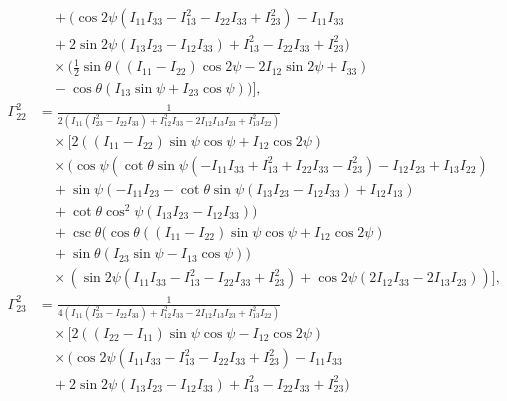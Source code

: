 \documentclass[pdflatex,sn-mathphys-num]{sn-jnl}%
\theoremstyle{thmstyleone}%
\theoremstyle{thmstyletwo}%
\theoremstyle{thmstylethree}%
\begin{document}
\begin{appendices}
\begin{align}
    &\quad +\Big(\cos 2\psi \left(I_{11} I_{33}-I_{13}^2-I_{22} I_{33}+I_{23}^2\right)-I_{11} I_{33} \nonumber \\
    &\quad +2 \sin 2\psi (I_{13} I_{23}-I_{12} I_{33})+I_{13}^2-I_{22} I_{33}+I_{23}^2\Big) \nonumber \\
    &\quad \times \bigg(\frac{1}{2} \sin \theta ((I_{11}-I_{22}) \cos 2\psi-2 I_{12} \sin 2\psi+I_{33}) \nonumber \\
    &\quad -\cos \theta (I_{13} \sin \psi+I_{23} \cos \psi)\bigg) \bigg], \nonumber \\
    \Gamma^{2}_{22} &= \frac{1}{2 \left(I_{11} \left(I_{23}^2-I_{22} I_{33}\right)+I_{12}^2 I_{33}-2 I_{12} I_{13} I_{23}+I_{13}^2 I_{22}\right)} \nonumber \\
    &\quad \times \bigg[ 2 ((I_{11}-I_{22}) \sin \psi \cos \psi+I_{12} \cos 2\psi) \nonumber \\
    &\quad \times \bigg(\cos \psi \left(\cot \theta \sin \psi \left(-I_{11} I_{33}+I_{13}^2+I_{22} I_{33}-I_{23}^2\right)-I_{12} I_{23}+I_{13} I_{22}\right) \nonumber \\
    &\quad +\sin \psi (-I_{11} I_{23}-\cot \theta \sin \psi (I_{13} I_{23}-I_{12} I_{33})+I_{12} I_{13}) \nonumber \\
    &\quad +\cot \theta \cos ^2\psi (I_{13} I_{23}-I_{12} I_{33})\bigg) \nonumber \\
    &\quad +\csc \theta (\cos \theta ((I_{11}-I_{22}) \sin \psi \cos \psi+I_{12} \cos 2\psi) \nonumber \\
    &\quad +\sin \theta (I_{23} \sin \psi-I_{13} \cos \psi)) \nonumber \\
    &\quad \times \left(\sin 2\psi \left(I_{11} I_{33}-I_{13}^2-I_{22} I_{33}+I_{23}^2\right)+\cos 2\psi (2 I_{12} I_{33}-2 I_{13} I_{23})\right) \bigg], \nonumber \\
    \Gamma^{2}_{23} &= \frac{1}{4 \left(I_{11} \left(I_{23}^2-I_{22} I_{33}\right)+I_{12}^2 I_{33}-2 I_{12} I_{13} I_{23}+I_{13}^2 I_{22}\right)} \nonumber \\
    &\quad \times \bigg[ 2 ((I_{22}-I_{11}) \sin \psi \cos \psi-I_{12} \cos 2\psi) \nonumber \\
    &\quad \times \Big(\cos 2\psi \left(I_{11} I_{33}-I_{13}^2-I_{22} I_{33}+I_{23}^2\right)-I_{11} I_{33} \nonumber \\
    &\quad +2 \sin 2\psi (I_{13} I_{23}-I_{12} I_{33})+I_{13}^2-I_{22} I_{33}+I_{23}^2\Big) \nonumber \\

\end{align}
\end{appendices}
\end{document}
